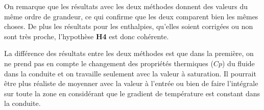 On remarque que les résultats avec les deux méthodes donnent des valeurs du même ordre de grandeur, ce qui confirme que les deux comparent bien les mêmes choses. De plus les résultats pour les enthalpies, qu'elles soient corrigées ou non sont très proche, l'hypothèse \textbf{H4} est donc cohérente.\\ \par
La différence des résultats entre les deux méthodes est que dans la première, on ne prend pas en compte le changement des propriétés thermiques ($Cp$) du fluide dans la conduite et on travaille seulement avec la valeur à saturation. Il pourrait être plus réaliste de moyenner avec la valeur à l'entrée ou bien de faire l'intégrale sur toute la zone en considérant que le gradient de température est constant dans la conduite.